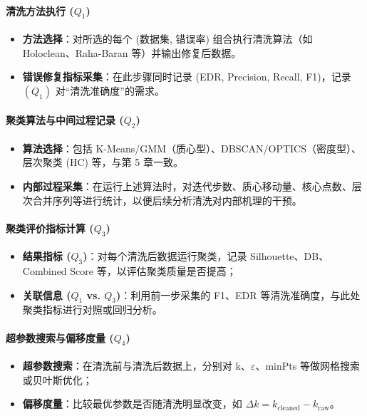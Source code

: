 \documentclass[10pt]{article} %
\numberwithin{equation}{section}
\begin{document}
\paragraph{清洗方法执行 (\(Q_1\))}
\begin{itemize}
    \item \textbf{方法选择}：对所选的每个 (数据集, 错误率) 组合执行清洗算法（如 Holoclean、Raha-Baran 等）并输出修复后数据。
    \item \textbf{错误修复指标采集}：在此步骤同时记录 (EDR, Precision, Recall, F1)，记录 \((Q_1)\) 对“清洗准确度”的需求。
\end{itemize}

\paragraph{聚类算法与中间过程记录 (\(Q_2\))}
\begin{itemize}
    \item \textbf{算法选择}：包括 K-Means/GMM（质心型）、DBSCAN/OPTICS（密度型）、层次聚类 (HC) 等，与第 5 章一致。
    \item \textbf{内部过程采集}：在运行上述算法时，对迭代步数、质心移动量、核心点数、层次合并序列等进行统计，以便后续分析清洗对内部机理的干预。
\end{itemize}

\paragraph{聚类评价指标计算 (\(Q_3\))}
\begin{itemize}
    \item \textbf{结果指标 (\(Q_3\))}：对每个清洗后数据运行聚类，记录 Silhouette、DB、Combined Score 等，以评估聚类质量是否提高；  
    \item \textbf{关联信息 (\(Q_1\) vs. \(Q_3\))}：利用前一步采集的 F1、EDR 等清洗准确度，与此处聚类指标进行对照或回归分析。
\end{itemize}

\paragraph{超参数搜索与偏移度量 (\(Q_4\))}
\begin{itemize}
    \item \textbf{超参数搜索}：在清洗前与清洗后数据上，分别对 k、$\varepsilon$、minPts 等做网格搜索或贝叶斯优化；
    \item \textbf{偏移度量}：比较最优参数是否随清洗明显改变，如 $\Delta k = k_{\text{cleaned}} - k_{\text{raw}}$。
\end{itemize}
\end{document}

